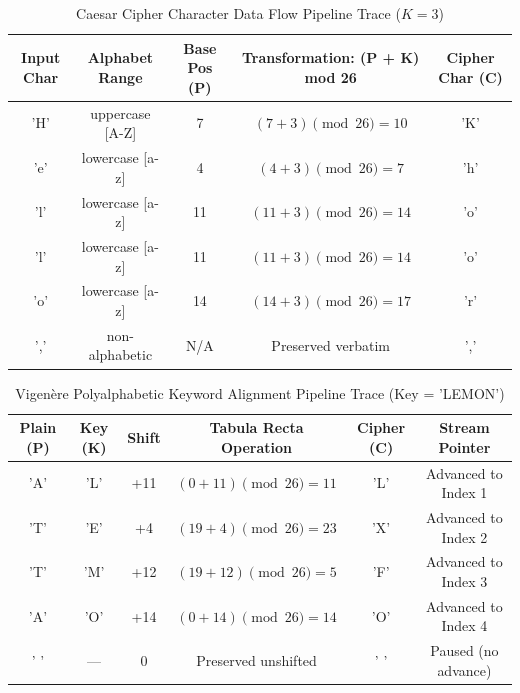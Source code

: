 \documentclass[12pt,a4paper]{report}
\begin{document}
\begin{table}[h!]
\centering
\small
\setlength{\tabcolsep}{4.5pt}
\begin{tabular}{|c|c|c|c|c|}
\hline
\rowcolor{tableheader}
\textbf{Input Char} & \textbf{Alphabet Range} & \textbf{Base Pos (P)} & \textbf{Transformation: (P + K) mod 26} & \textbf{Cipher Char (C)} \\
\hline
'H' & uppercase [A-Z] & 7 & $(7 + 3) \pmod{26} = 10$ & 'K' \\
\hline
'e' & lowercase [a-z] & 4 & $(4 + 3) \pmod{26} = 7$ & 'h' \\
\hline
'l' & lowercase [a-z] & 11 & $(11 + 3) \pmod{26} = 14$ & 'o' \\
\hline
'l' & lowercase [a-z] & 11 & $(11 + 3) \pmod{26} = 14$ & 'o' \\
\hline
'o' & lowercase [a-z] & 14 & $(14 + 3) \pmod{26} = 17$ & 'r' \\
\hline
',' & non-alphabetic & N/A & Preserved verbatim & ',' \\
\hline
\end{tabular}
\caption{Caesar Cipher Character Data Flow Pipeline Trace ($K = 3$)}
\label{tab:pipe_caesar}
\end{table}

\vspace{-0.5em}

\begin{table}[h!]
\centering
\small
\begin{tabular}{|c|c|c|c|c|c|}
\hline
\rowcolor{tableheader}
\textbf{Plain (P)} & \textbf{Key (K)} & \textbf{Shift} & \textbf{Tabula Recta Operation} & \textbf{Cipher (C)} & \textbf{Stream Pointer} \\
\hline
'A' & 'L' & +11 & $(0 + 11) \pmod{26} = 11$ & 'L' & Advanced to Index 1 \\
\hline
'T' & 'E' & +4 & $(19 + 4) \pmod{26} = 23$ & 'X' & Advanced to Index 2 \\
\hline
'T' & 'M' & +12 & $(19 + 12) \pmod{26} = 5$ & 'F' & Advanced to Index 3 \\
\hline
'A' & 'O' & +14 & $(0 + 14) \pmod{26} = 14$ & 'O' & Advanced to Index 4 \\
\hline
' ' & --- & 0 & Preserved unshifted & ' ' & Paused (no advance) \\
\hline
\end{tabular}
\caption{Vigen\`ere Polyalphabetic Keyword Alignment Pipeline Trace (Key = 'LEMON')}
\label{tab:pipe_vigenere}
\end{table}
\end{document}
